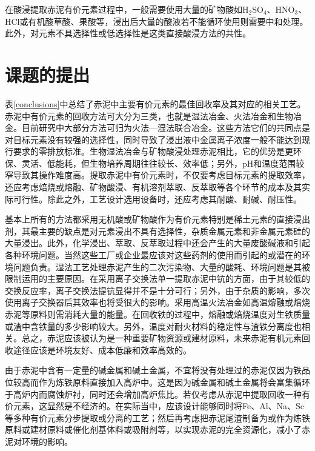 在酸浸提取赤泥有价元素过程中，一般需要使用大量的矿物酸如H$ _{\mathrm{2}} $SO$ _{\mathrm{4}} $、HNO$ _{\mathrm{3}} $、HCl或有机酸草酸、果酸等，浸出后大量的酸液若不能循环使用则需要中和处理。此外，对元素不具选择性或低选择性是这类直接酸浸方法的共性。


\section{课题的提出}
表\ref{conclusions}中总结了赤泥中主要有价元素的最佳回收率及其对应的相关工艺\cite{liu2009application,zhong2009extraction,vachon1994chemical,liu2012experimental,li2009recovery,uzun2007dissolution,eisele2014review,erccaug1997furnace,deep2001extraction,mukherjee1990recovery,ochsenkuhn2002pilot,sinha2014extraction,ochsenkuhn1995selective,ochsenkuhn1996recovery}。赤泥中有价元素的回收方法可大分为三类，也就是湿法冶金、火法冶金和生物冶金。目前研究中大部分方法可归为火法—湿法联合冶金。这些方法它们的共同点是对目标元素没有较强的选择性，同时导致了浸出液中金属离子浓度一般不能达到现行要求的零排放标准。生物湿法冶金与矿物酸浸处理赤泥相比，它的优势是更环保、灵活、低能耗，但生物培养周期往往较长、效率低；另外，pH和温度范围较窄导致其操作难度高。提取赤泥中有价元素时，不仅要考虑目标元素的提取效率，还应考虑焙烧或熔融、矿物酸浸、有机溶剂萃取、反萃取等各个环节的成本及其实际可行性。除此之外，工艺设计选用设备时，还应考虑其耐酸、耐碱、耐压性。

基本上所有的方法都采用无机酸或矿物酸作为有价元素特别是稀土元素的直接浸出剂，其最主要的缺点是对元素浸出不具有选择性，杂质金属元素和非金属元素硅的大量浸出。此外，化学浸出、萃取、反萃取过程中还会产生的大量废酸碱液和引起各种环境问题。当然这些工厂或企业最应该对这些药剂的使用而引起的或潜在的环境问题负责。湿法工艺处理赤泥产生的二次污染物、大量的酸耗、环境问题是其被限制运用的主要原因。在采用离子交换法单一提取赤泥中钪的方面，由于其较低的交换反应率，离子交换法提钪显得并不是十分可行；另外，由于杂质的影响，多次使用离子交换器后其效率也将受很大的影响。采用高温火法冶金如高温熔融或焙烧赤泥等原料则需消耗大量的能量。在回收铁的过程中，熔融或焙烧温度对生铁质量或渣中含铁量的多少影响较大。另外，温度对耐火材料的稳定性与渣铁分离度也相关。总之，赤泥应该被认为是一种重要矿物资源或建材原料，未来赤泥有机元素回收途径应该是环境友好、成本低廉和效率高效的。

由于赤泥中含有一定量的碱金属和碱土金属，不宜将没有处理过的赤泥仅因为铁品位较高而作为炼铁原料直接加入高炉中。这是因为碱金属和碱土金属将会富集循环于高炉内而腐蚀炉衬，同时还会增加高炉焦比。若仅考虑从赤泥中提取回收一种有价元素，这显然是不经济的。在实际当中，应该设计能够同时将Fe、Al、Na、Sc等多种有价元素分步提取或分离的工艺；然后再考虑把赤泥尾渣制备为或作为炼铁原料或建材原料或催化剂基体料或吸附剂等，以实现赤泥的完全资源化，减小了赤泥对环境的影响。

